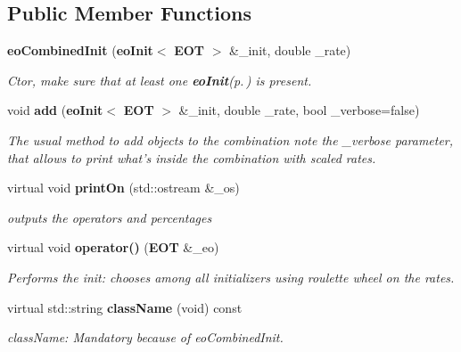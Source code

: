 \subsection*{Public Member Functions}
\begin{CompactItemize}
\item 
{\bf eo\-Combined\-Init} ({\bf eo\-Init}$<$ {\bf EOT} $>$ \&\_\-init, double \_\-rate)\label{classeo_combined_init_a0}

\begin{CompactList}\small\item\em Ctor, make sure that at least one {\bf eo\-Init}{\rm (p.\,\pageref{classeo_init})} is present. \item\end{CompactList}\item 
void {\bf add} ({\bf eo\-Init}$<$ {\bf EOT} $>$ \&\_\-init, double \_\-rate, bool \_\-verbose=false)\label{classeo_combined_init_a1}

\begin{CompactList}\small\item\em The usual method to add objects to the combination note the \_\-verbose parameter, that allows to print what's inside the combination with scaled rates. \item\end{CompactList}\item 
virtual void {\bf print\-On} (std::ostream \&\_\-os)\label{classeo_combined_init_a2}

\begin{CompactList}\small\item\em outputs the operators and percentages \item\end{CompactList}\item 
virtual void {\bf operator()} ({\bf EOT} \&\_\-eo)\label{classeo_combined_init_a3}

\begin{CompactList}\small\item\em Performs the init: chooses among all initializers using roulette wheel on the rates. \item\end{CompactList}\item 
virtual std::string {\bf class\-Name} (void) const 
\begin{CompactList}\small\item\em class\-Name: Mandatory because of eo\-Combined\-Init. \item\end{CompactList}\end{CompactItemize}
